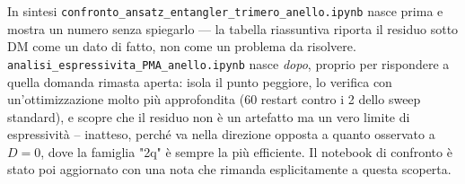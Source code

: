 \documentclass[11pt,a4paper]{article}
\begin{document}
\begin{okbox}{In sintesi}
\texttt{confronto\_ansatz\_entangler\_trimero\_anello.ipynb} nasce prima
e mostra un numero senza spiegarlo --- la tabella riassuntiva riporta
il residuo sotto DM come un dato di fatto, non come un problema da
risolvere. \texttt{analisi\_espressivita\_PMA\_anello.ipynb} nasce
\emph{dopo}, proprio per rispondere a quella domanda rimasta aperta:
isola il punto peggiore, lo verifica con un'ottimizzazione molto più
approfondita (60 restart contro i 2 dello sweep standard), e scopre che
il residuo non è un artefatto ma un vero limite di espressività --
inatteso, perché va nella direzione opposta a quanto osservato a
$D=0$, dove la famiglia "2q" è sempre la più efficiente. Il notebook di
confronto è stato poi aggiornato con una nota che rimanda esplicitamente
a questa scoperta.
\end{okbox}
\end{document}
